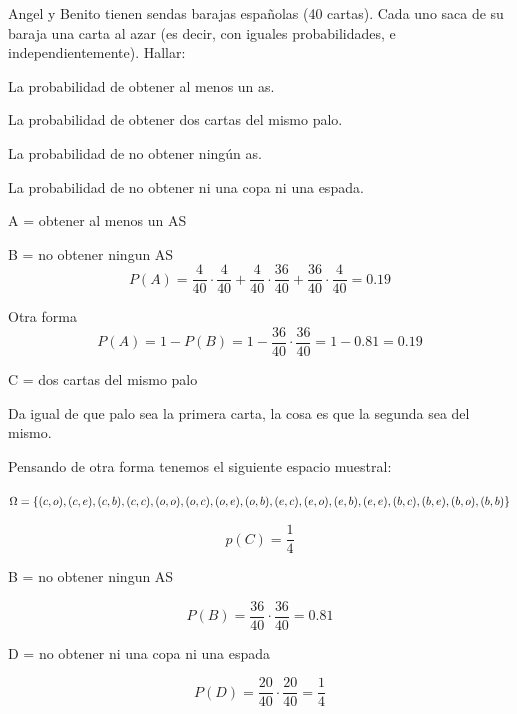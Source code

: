 \begin{problem}[4]Angel y Benito tienen sendas barajas espa\~nolas (40 cartas). Cada uno saca de su
baraja una carta al azar (es decir, con iguales probabilidades, e independientemente). Hallar:

\ppart La probabilidad de obtener al menos un as. 

\ppart La probabilidad de obtener dos cartas del mismo palo. 

\ppart La probabilidad de no obtener ning\'un as.

\ppart La probabilidad de no obtener ni una copa ni una espada.
\solution

\begin{expla}

\end{expla}

\spart
A = obtener al menos un AS

B = no obtener ningun AS
\[
P(A)=\frac{4}{40}\cdot\frac{4}{40}+\frac{4}{40}\cdot\frac{36}{40}+\frac{36}{40}\cdot\frac{4}{40} = 0.19
\]

Otra forma
\[
P(A)=1-P(B)=1-\frac{36}{40}\cdot\frac{36}{40} = 1 - 0.81 = 0.19
\]

\spart
C = dos cartas del mismo palo

Da igual de que palo sea la primera carta, la cosa es que la segunda sea del mismo.

Pensando de otra forma tenemos el siguiente espacio muestral:

$\Omega = \{(c, o),(c, e),(c, b),(c, c),(o, o),(o, c),(o, e),(o, b),(e, c),(e, o),(e, b),(e, e),(b, c),(b, e)\\,(b, o),(b, b)\}$

\[
p(C)=\frac{1}{4}
\]

\spart
B = no obtener ningun AS

\[
P(B)=\frac{36}{40}\cdot\frac{36}{40} = 0.81
\]

\spart
D = no obtener ni una copa ni una espada

\[
P(D) = \frac{20}{40}\cdot\frac{20}{40}=\frac{1}{4}
\]


\end{problem}


